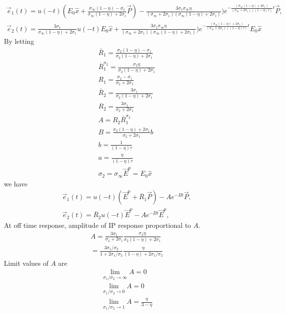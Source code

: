 \documentclass[a4paper, 11pt]{article}
\newcommand {\E}{{\vec E}}
\newcommand{\siginf}{\sigma_\infty}
\newcommand {\e}  { {\vec e} }
\begin{document}
\begin{align*}
	\e_1(t) = u(-t)(E_0\hat{x}+\frac{\siginf(1-\eta)-\sigma_1}{\siginf(1-\eta)+2\sigma_1} \vec{P})  - \frac{3\sigma_1\siginf\eta}{(\siginf+2\sigma_1)(\siginf(1-\eta)+2\sigma_1)})
	e^{-\frac{(\siginf(1-\eta)+2\sigma_1)}{(\siginf + 2\sigma_1)((1-\eta)\tau)}t}\vec{P}, \\
	\e_2(t) = \frac{3\sigma_1}{\siginf(1-\eta)+2\sigma_1}u(-t)E_0\hat{x}
	+ \frac{3\sigma_1\siginf\eta}{(\siginf+2\sigma_1)(\siginf(1-\eta)+2\sigma_1)})
	e^{-\frac{(\siginf(1-\eta)+2\sigma_1)}{(\siginf + 2\sigma_1)((1-\eta)\tau)}t}E_0\hat{x}
\end{align*}
By letting 
\begin{eqnarray*}
	\bar{R}_1 = \frac{\sigma_2 (1-\eta)-\sigma_1}{\sigma_2(1-\eta) + 2\sigma_1} \\
	\bar{R}^{\sigma_2}_1 = \frac{\sigma_2 \eta}{\sigma_2(1-\eta) + 2\sigma_1} \\
	R_1 = \frac{\sigma_2-\sigma_1}{\sigma_2 + 2\sigma_1} \\
	\bar{R}_2 = \frac{3\sigma_1}{\sigma_2(1-\eta) + 2\sigma_1} \\
	R_2 = \frac{3\sigma_1}{\sigma_2 + 2\sigma_1} \\
	A = R_2\bar{R}^{\sigma_2}_1 \\
	B = \frac{\sigma_2(1-\eta)+2\sigma_1}{\sigma_2 + 2\sigma_1}b \\
	b = \frac{1}{(1-\eta)\tau} \\
	a = \frac{\eta}{(1-\eta)\tau} \\
	\sigma_2 = \siginf
	\E^p = E_0\hat{x}
\end{eqnarray*}
we have
\begin{align*}
	\e_1(t) = u(-t)(\E^p+\bar{R}_1 \vec{P})  - A
	e^{-Bt}\vec{P}, \\
	\e_2(t) = \bar{R}_2u(-t)\E^p
	- Ae^{-Bt}\E^p,
\end{align*}
At off time response, amplitude of IP response proportional to $A$. 
\begin{align*}
	A = \frac{3\sigma_1}{\sigma_2 + 2\sigma_1} \frac{\sigma_2 \eta}{\sigma_2(1-\eta) + 2\sigma_1} \\
	= \frac{3\sigma_1 / \sigma_2}{ 1+ 2 \sigma_1 / \sigma_2} 
	\frac{\eta}{(1-\eta) + 2\sigma_1/ \sigma_2}
\end{align*}
Limit values of $A$ are 
\begin{align}
	\lim_{ \sigma_1/ \sigma_2 \to\infty} A = 0 \\
	\lim_{ \sigma_1/ \sigma_2 \to 0} A = 0 \\
	\lim_{ \sigma_1/ \sigma_2 \to 1} A = \frac{\eta}{3-\eta} 
\end{align}
\end{document}

